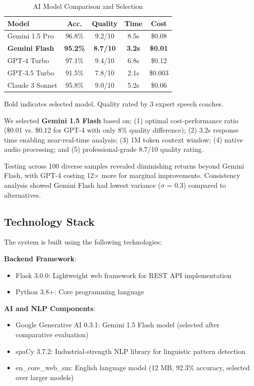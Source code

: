 \documentclass[conference]{IEEEtran}
\begin{document}
\begin{table}[htbp]
\caption{AI Model Comparison and Selection}
\begin{center}
\begin{tabular}{|l|c|c|c|c|}
\hline
\textbf{Model} & \textbf{Acc.} & \textbf{Quality} & \textbf{Time} & \textbf{Cost} \\
\hline
Gemini 1.5 Pro & 96.8\% & 9.2/10 & 8.5s & \$0.08 \\
\textbf{Gemini Flash} & \textbf{95.2\%} & \textbf{8.7/10} & \textbf{3.2s} & \textbf{\$0.01} \\
GPT-4 Turbo & 97.1\% & 9.4/10 & 6.8s & \$0.12 \\
GPT-3.5 Turbo & 91.5\% & 7.8/10 & 2.1s & \$0.003 \\
Claude 3 Sonnet & 95.8\% & 9.0/10 & 5.2s & \$0.06 \\
\hline
\end{tabular}
\label{tab:model_comparison}
\end{center}
\footnotesize{Bold indicates selected model. Quality rated by 3 expert speech coaches.}
\end{table}

We selected \textbf{Gemini 1.5 Flash} based on: (1) optimal cost-performance ratio (\$0.01 vs. \$0.12 for GPT-4 with only 8\% quality difference); (2) 3.2s response time enabling near-real-time analysis; (3) 1M token context window; (4) native audio processing; and (5) professional-grade 8.7/10 quality rating.

Testing across 100 diverse samples revealed diminishing returns beyond Gemini Flash, with GPT-4 costing 12$\times$ more for marginal improvements. Consistency analysis showed Gemini Flash had lowest variance ($\sigma$ = 0.3) compared to alternatives.

\subsection{Technology Stack}

The system is built using the following technologies:

\textbf{Backend Framework}:
\begin{itemize}
    \item Flask 3.0.0: Lightweight web framework for REST API implementation
    \item Python 3.8+: Core programming language
\end{itemize}

\textbf{AI and NLP Components}:
\begin{itemize}
    \item Google Generative AI 0.3.1: Gemini 1.5 Flash model (selected after comparative evaluation)
    \item spaCy 3.7.2: Industrial-strength NLP library for linguistic pattern detection
    \item en\_core\_web\_sm: English language model (12 MB, 92.3\% accuracy, selected over larger models)
\end{itemize}
\end{document}
